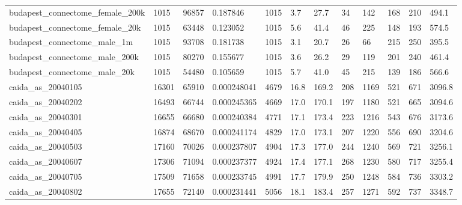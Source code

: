 \begin{longtable}{llllllllllll}
 budapest\_connectome\_female\_200k                    & 1015       & 96857     & 0.187846    & 1015  & 3.7    & 27.7   & 34    & 142    & 168    & 210    & 494.1   \\
 budapest\_connectome\_female\_20k                     & 1015       & 63448     & 0.123052    & 1015  & 5.6    & 41.4   & 46    & 225    & 148    & 193    & 574.5   \\
 budapest\_connectome\_male\_1m                        & 1015       & 93708     & 0.181738    & 1015  & 3.1    & 20.7   & 26    & 66     & 215    & 250    & 395.5   \\
 budapest\_connectome\_male\_200k                      & 1015       & 80270     & 0.155677    & 1015  & 3.6    & 26.2   & 29    & 119    & 201    & 240    & 461.4   \\
 budapest\_connectome\_male\_20k                       & 1015       & 54480     & 0.105659    & 1015  & 5.7    & 41.0   & 45    & 215    & 139    & 186    & 566.6   \\
 caida\_as\_20040105                                  & 16301      & 65910     & 0.000248041 & 4679  & 16.8   & 169.2  & 208   & 1169   & 521    & 671    & 3096.8  \\
 caida\_as\_20040202                                  & 16493      & 66744     & 0.000245365 & 4669  & 17.0   & 170.1  & 197   & 1180   & 521    & 665    & 3094.6  \\
 caida\_as\_20040301                                  & 16655      & 66680     & 0.000240384 & 4771  & 17.1   & 173.4  & 223   & 1216   & 543    & 676    & 3173.6  \\
 caida\_as\_20040405                                  & 16874      & 68670     & 0.000241174 & 4829  & 17.0   & 173.1  & 207   & 1220   & 556    & 690    & 3204.6  \\
 caida\_as\_20040503                                  & 17160      & 70026     & 0.000237807 & 4904  & 17.3   & 177.0  & 244   & 1240   & 569    & 721    & 3256.1  \\
 caida\_as\_20040607                                  & 17306      & 71094     & 0.000237377 & 4924  & 17.4   & 177.1  & 268   & 1230   & 580    & 717    & 3255.4  \\
 caida\_as\_20040705                                  & 17509      & 71658     & 0.000233745 & 4991  & 17.7   & 179.9  & 250   & 1248   & 584    & 736    & 3303.2  \\
 caida\_as\_20040802                                  & 17655      & 72140     & 0.000231441 & 5056  & 18.1   & 183.4  & 257   & 1271   & 592    & 737    & 3348.7  \\

\end{longtable}
